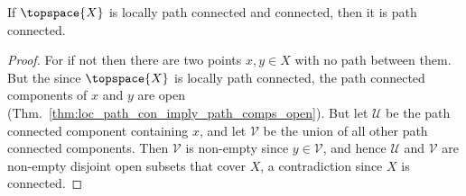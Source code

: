\documentclass{article}                                                        %
\begin{document}
            \begin{theorem}
                \label{thm:Loc_Path_and_Con_Imply_Path_Con}
                If $\topspace{X}$ is locally path connected and connected, then it
                is path connected.
            \end{theorem}
            \begin{proof}
                For if not then there are two points $x,y\in{X}$ with no path
                between them. But the since $\topspace{X}$ is locally path
                connected, the path connected components of $x$ and $y$ are open
                (Thm.~\ref{thm:loc_path_con_imply_path_comps_open}). But let
                $\mathcal{U}$ be the path connected component containing $x$, and
                let $\mathcal{V}$ be the union of all other path connected
                components. Then $\mathcal{V}$ is non-empty since $y\in\mathcal{V}$,
                and hence $\mathcal{U}$ and $\mathcal{V}$ are non-empty disjoint
                open subsets that cover $X$, a contradiction since $X$ is connected.
            \end{proof}
\end{document}
